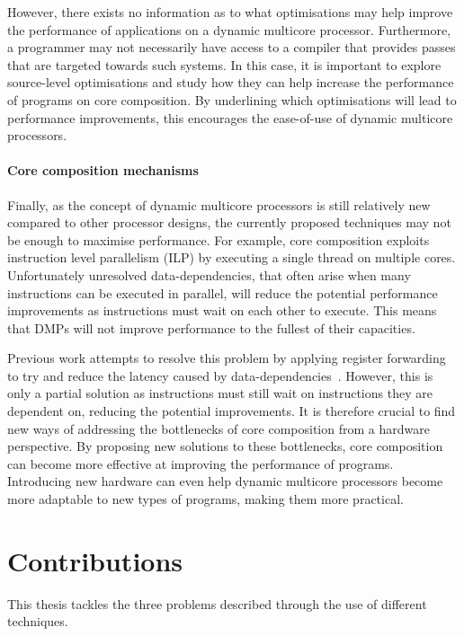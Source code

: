 However, there exists no information as to what optimisations may help improve the performance of applications on a dynamic multicore processor.
Furthermore, a programmer may not necessarily have access to a compiler that provides passes that are targeted towards such systems.
In this case, it is important to explore source-level optimisations and study how they can help increase the performance of programs on core composition.
By underlining which optimisations will lead to performance improvements, this encourages the ease-of-use of dynamic multicore processors.

\paragraph*{Core composition mechanisms} 
Finally, as the concept of dynamic multicore processors is still relatively new compared to other processor designs, the currently proposed techniques may not be enough to maximise performance.
For example, core composition exploits instruction level parallelism (ILP) by executing a single thread on multiple cores.
Unfortunately unresolved data-dependencies, that often arise when many instructions can be executed in parallel, will reduce the potential performance improvements as instructions must wait on each other to execute.
This means that DMPs will not improve performance to the fullest of their capacities.

Previous work attempts to resolve this problem by applying register forwarding to try and reduce the latency caused by data-dependencies~\cite{robatmili2011uniproc}.
However, this is only a partial solution as instructions must still wait on instructions they are dependent on, reducing the potential improvements. 
It is therefore crucial to find new ways of addressing the bottlenecks of core composition from a hardware perspective.
By proposing new solutions to these bottlenecks, core composition can become more effective at improving the performance of programs.
Introducing new hardware can even help dynamic multicore processors become more adaptable to new types of programs, making them more practical.

\vspace{-1em}
\section{Contributions}
This thesis tackles the three problems described through the use of different techniques.

